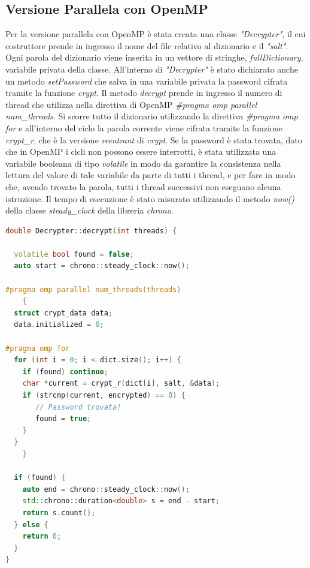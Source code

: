 \documentclass[10pt,twocolumn,letterpaper]{article}
\begin{document}
\subsection{Versione Parallela con OpenMP}
Per la versione parallela con OpenMP è stata creata una classe \textit{"Decrypter"}, il cui costruttore prende in ingresso il nome del file relativo al dizionario e il \textit{"salt"}. Ogni parola del dizionario viene inserita in un vettore di stringhe, \textit{fullDictionary}, variabile privata della classe. All'interno di \textit{"Decrypter"} è stato dichiarato anche un metodo \textit{setPassword} che salva in una variabile privata la password cifrata tramite la funzione \textit{crypt}. Il metodo \textit{decrypt} prende in ingresso il numero di thread che utilizza nella direttiva di OpenMP \textit{\#pragma omp parallel num\_threads}.\newline
Si scorre tutto il dizionario utilizzando la direttiva \textit{\#pragma omp for} e all'interno del ciclo la parola corrente viene cifrata tramite la funzione \textit{crypt\_r}, che è la versione \textit{reentrant} di \textit{crypt}.\newline
Se la password è stata trovata, dato che in OpenMP i cicli non possono essere interrotti, è stata utilizzata una variabile booleana di tipo \textit{volatile} in modo da garantire la consistenza nella lettura del valore di tale variabile da parte di tutti i thread, e per fare in modo che, avendo trovato la parola, tutti i thread successivi non eseguano alcuna istruzione.\newline
Il tempo di esecuzione è stato misurato utilizzando il metodo \textit{now()} della classe \textit{steady\_clock} della libreria \textit{chrono}.
\clearpage
\begin{lstlisting}[basicstyle=\scriptsize, language=C++, frame=single, caption={Esempio di ricerca in parallelo con OpenMP},captionpos=b]
double Decrypter::decrypt(int threads) {

  volatile bool found = false;
  auto start = chrono::steady_clock::now();

#pragma omp parallel num_threads(threads)
    {
  struct crypt_data data;
  data.initialized = 0;

#pragma omp for
  for (int i = 0; i < dict.size(); i++) {
    if (found) continue;
    char *current = crypt_r(dict[i], salt, &data);
    if (strcmp(current, encrypted) == 0) {
       // Password trovata!
       found = true;
    }
  }
    }

  if (found) {
    auto end = chrono::steady_clock::now();
    std::chrono::duration<double> s = end - start;
    return s.count();
  } else {
    return 0;
  }
}
\end{lstlisting}
\end{document}
